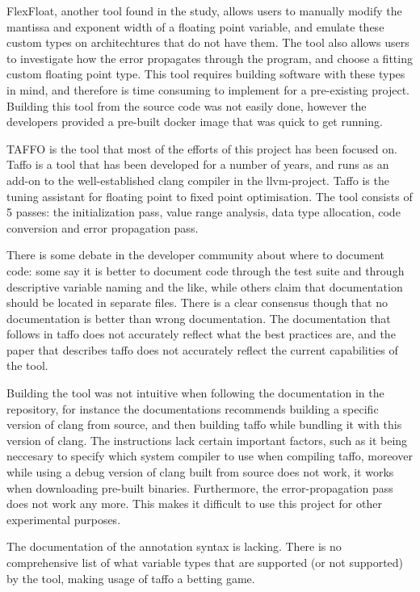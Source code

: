 
FlexFloat, another tool found in the study, allows users to manually modify the mantissa and exponent width of a floating point variable, and emulate these custom types on architechtures that do not have them. The tool also allows users to investigate how the error propagates through the program, and choose a fitting custom floating point type. This tool requires building software with these types in mind, and therefore is time consuming to implement for a pre-existing project. Building this tool from the source code was not easily done, however the developers provided a pre-built docker image that was quick to get running.


TAFFO is the tool that most of the efforts of this project has been focused on. Taffo is a tool that has been developed for a number of years, and runs as an add-on to the well-established clang compiler in the llvm-project.
Taffo is the tuning assistant for floating point to fixed point optimisation. The tool consists of 5 passes: the initialization pass, value range analysis, data type allocation, code conversion and error propagation pass.

There is some debate in the developer community about where to document code: some say it is better to document code through the test suite and through descriptive variable naming and the like, while others claim that documentation should be located in separate files. There is a clear consensus though that no documentation is better than wrong documentation.
The documentation that follows in taffo does not accurately reflect what the best practices are, and the paper that describes taffo does not accurately reflect the current capabilities of the tool.

Building the tool was not intuitive when following the documentation in the repository, for instance the documentations recommends building a specific version of clang from source, and then building taffo while bundling it with this version of clang. The instructions lack certain important factors, such as it being neccesary to specify which system compiler to use when compiling taffo, moreover while using a debug version of clang built from source does not work, it works when downloading pre-built binaries.
Furthermore, the error-propagation pass does not work any more. This makes it difficult to use this project for other experimental purposes.

The documentation of the annotation syntax is lacking. There is no comprehensive list of what variable types that are supported (or not supported) by the tool, making usage of taffo a betting game.